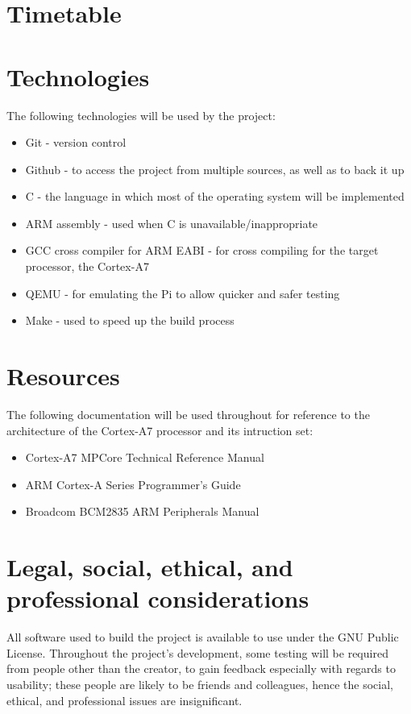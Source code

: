 \documentclass[10pt,a4paper]{article}
\begin{document}
\section{Timetable}

\section{Technologies}
The following technologies will be used by the project:
\begin{itemize}
    \item Git - version control
    \item Github - to access the project from multiple sources, as well as to
        back it up
    \item C - the language in which most of the operating system will be
        implemented
    \item ARM assembly - used when C is unavailable/inappropriate
        \cite{CannotDoC}
    \item GCC cross compiler for ARM EABI - for cross compiling for the target
        processor, the Cortex-A7 \cite{CrossCompilation}
    \item QEMU - for emulating the Pi to allow quicker and safer testing
        \cite{qemu}
    \item Make - used to speed up the build process
\end{itemize}

\section{Resources}
The following documentation will be used throughout for reference to the
architecture of the Cortex-A7 processor and its intruction set:
        \begin{itemize}
            \item Cortex-A7 MPCore Technical Reference Manual
            \item ARM Cortex-A Series Programmer's Guide
            \item Broadcom BCM2835 ARM Peripherals Manual
        \end{itemize}

\section{Legal, social, ethical, and professional  considerations}
All software used to build the project is available to use under the GNU Public
License. Throughout the project's development, some testing will be required
from people other than the creator, to gain feedback especially with regards to
usability; these people are likely to be friends and colleagues, hence the
social, ethical, and professional issues are insignificant.


\end{document}
